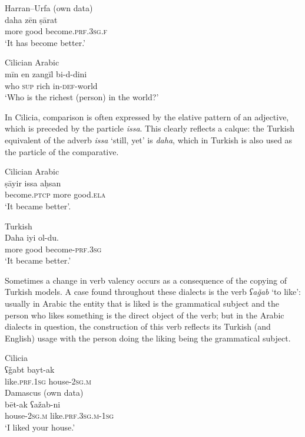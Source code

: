 \documentclass[output=paper]{langsci/langscibook}
\begin{document}
\ea 
{Harran--Urfa (own data)}\\
\gll daha zēn ṣārat\\
     more good become.\textsc{prf.3sg.f}\\
\glt ‘It has become better.’
\z

\ea 
{Cilician Arabic \citep[155]{Procházka2002Cukurova}} \\
\gll mīn en zangīl bi-d-dini\\
     who \textsc{sup} rich in-\textsc{def}-world\\
\glt ‘Who is the richest (person) in the world?’ 
\z

In Cilicia, comparison is often expressed by the elative pattern of an adjective, which is preceded by the particle \textit{issa}. This clearly reflects a calque: the Turkish equivalent of the adverb \textit{issa} ‘still, yet’ is \textit{daha}, which in Turkish is also used as the particle of the comparative. 

\ea 
{Cilician Arabic \citep[202]{Procházka2002Cukurova}} \\
\gll ṣāyir issa aḥsan \\
     become.\textsc{ptcp} more good.\textsc{ela}\\
\glt ‘It became better’. 
\z

\ea 
{Turkish}\\
\gll Daha iyi ol-du.\\
     more good become-\textsc{prf.3sg}\\
\glt ‘It became better.’
\z

Sometimes a change in verb valency occurs as a consequence of the copying of Turkish models. A case found throughout these dialects is the verb \textit{ʕaǧab} ‘to like’: usually in Arabic the entity that is liked is the grammatical subject and the person who likes something is the direct object of the verb; but in the Arabic dialects in question, the construction of this verb reflects its Turkish (and English) usage with the person doing the liking being the grammatical subject.

\ea 
\ea Cilicia \citep[200]{Procházka2002Cukurova}\\
   \gll ʕǧabt bayt-ak\\
     like.\textsc{prf.1sg} house-\textsc{2sg.m}\\
\ex
 Damascus (own data)\\
   \gll bēt-ak ʕažab-ni\\
     house-\textsc{2sg.m} like.\textsc{prf.3sg.m-1sg}\\
\glt ‘I liked your house.’
\z
\z
\end{document}

